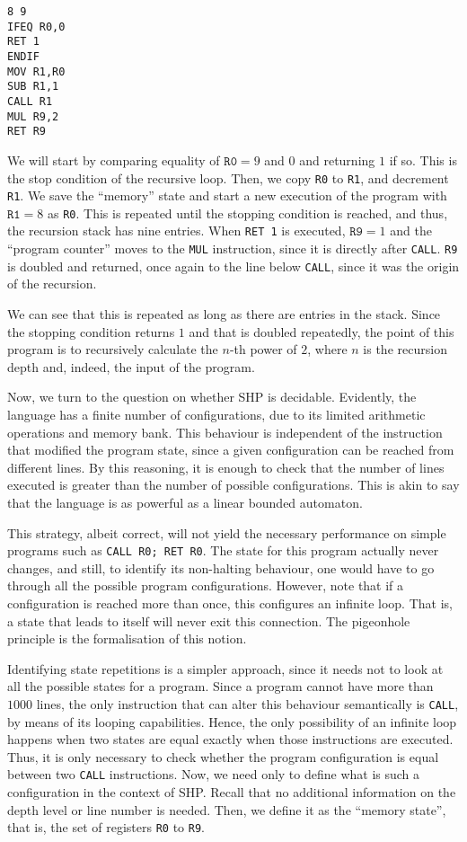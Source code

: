 \documentclass[12pt]{article}
\begin{document}
{\footnotesize
\begin{verbatim}
8 9
IFEQ R0,0
RET 1
ENDIF
MOV R1,R0
SUB R1,1
CALL R1
MUL R9,2
RET R9
\end{verbatim}}

We will start by comparing equality of $\texttt{R0} = 9$ and $0$ and returning $1$ if so. This is the stop condition of the recursive loop. Then, we copy \texttt{R0} to \texttt{R1}, and decrement \texttt{R1}. We save the ``memory'' state and start a new execution of the program with $\texttt{R1} = 8$ as \texttt{R0}. This is repeated until the stopping condition is reached, and thus, the recursion stack has nine entries. When \texttt{RET 1} is executed, $\texttt{R9} = 1$ and the ``program counter'' moves to the \texttt{MUL} instruction, since it is directly after \texttt{CALL}. \texttt{R9} is doubled and returned, once again to the line below \texttt{CALL}, since it was the origin of the recursion. 

We can see that this is repeated as long as there are entries in the stack. Since the stopping condition returns $1$ and that is doubled repeatedly, the point of this program is to recursively calculate the $n$-th power of $2$, where $n$ is the recursion depth and, indeed, the input of the program.

Now, we turn to the question on whether SHP is decidable. Evidently, the language has a finite number of configurations, due to its limited arithmetic operations and memory bank. This behaviour is independent of the instruction that modified the program state, since a given configuration can be reached from different lines. By this reasoning, it is enough to check that the number of lines executed is greater than the number of possible configurations. This is akin to say that the language is as powerful as a linear bounded automaton.

This strategy, albeit correct, will not yield the necessary performance on simple programs such as \texttt{CALL R0; RET R0}. The state for this program actually never changes, and still, to identify its non-halting behaviour, one would have to go through all the possible program configurations. However, note that if a configuration is reached more than once, this configures an infinite loop. That is, a state that leads to itself will never exit this connection. The pigeonhole principle is the formalisation of this notion. 

Identifying state repetitions is a simpler approach, since it needs not to look at all the possible states for a program. Since a program cannot have more than $1000$ lines, the only instruction that can alter this behaviour semantically is \texttt{CALL}, by means of its looping capabilities. Hence, the only possibility of an infinite loop happens when two states are equal exactly when those instructions are executed. Thus, it is only necessary to check whether the program configuration is equal between two \texttt{CALL} instructions. Now, we need only to define what is such a configuration in the context of SHP. Recall that no additional information on the depth level or line number is needed. Then, we define it as the ``memory state'', that is, the set of registers \texttt{R0} to \texttt{R9}. 
\end{document}
